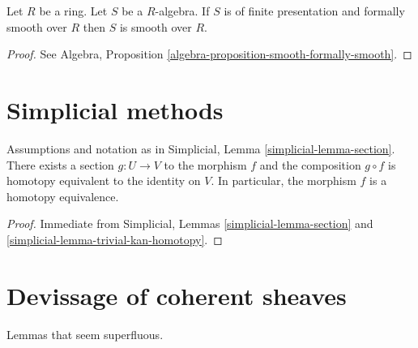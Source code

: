 \begin{lemma}
\label{lemma-formally-smooth-smooth}
Let $R$ be a ring. Let $S$ be a $R$-algebra.
If $S$ is of finite presentation and formally smooth over $R$
then $S$ is smooth over $R$.
\end{lemma}

\begin{proof}
See Algebra, Proposition \ref{algebra-proposition-smooth-formally-smooth}.
\end{proof}


\section{Simplicial methods}
\label{section-simplicial}


\begin{lemma}
\label{lemma-equiv}
Assumptions and notation as in
Simplicial, Lemma \ref{simplicial-lemma-section}.
There exists a section $g : U \to V$ to the morphism $f$ and
the composition $g \circ f$ is homotopy equivalent to the identity
on $V$. In particular, the morphism $f$ is a homotopy equivalence.
\end{lemma}

\begin{proof}
Immediate from Simplicial, Lemmas \ref{simplicial-lemma-section} and
\ref{simplicial-lemma-trivial-kan-homotopy}.
\end{proof}



\section{Devissage of coherent sheaves}
\label{section-devissage}

\noindent
Lemmas that seem superfluous.

